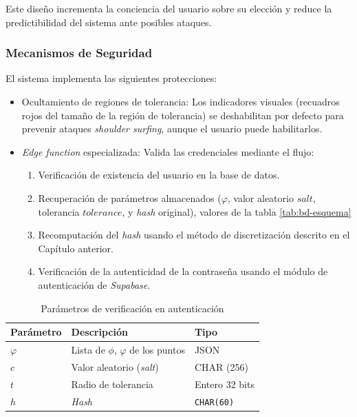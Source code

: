 Este diseño incrementa la conciencia del usuario sobre su elección y reduce la predictibilidad del sistema ante posibles ataques.

\subsubsection{Mecanismos de Seguridad}
El sistema implementa las siguientes protecciones:

\begin{itemize}
	\item Ocultamiento de regiones de tolerancia: Los indicadores visuales (recuadros rojos del tama\~no de la regi\'on de tolerancia) se deshabilitan por defecto para prevenir ataques \textit{shoulder surfing}, aunque el usuario puede habilitarlos.
	\item \textit{Edge function} especializada: Valida las credenciales mediante el flujo:
	\begin{enumerate}
		\item Verificación de existencia del usuario en la base de datos.
		\item Recuperación de parámetros almacenados ($\varphi$, valor aleatorio $salt$, tolerancia $tolerance$, y \textit{hash} original), valores de la tabla \ref{tab:bd-esquema}
		\item Recomputación del \textit{hash} usando el método de discretización descrito en el Capítulo anterior.
		\item Verificaci\'on de la autenticidad de la contrase\~na usando el m\'odulo de autenticaci\'on de \textit{Supabase}.
	\end{enumerate}
\end{itemize}

\begin{table}[ht]
	\centering
	\caption{Parámetros de verificación en autenticación}
	\label{tab:parametros-verificacion}
	\begin{tabularx}{\textwidth}{lXl}
		\toprule
		\textbf{Parámetro} & \textbf{Descripción} & \textbf{Tipo} \\
		\midrule
		$\varphi$ & Lista de $\phi$, $\varphi$ de los puntos & JSON \\
		$c$ & Valor aleatorio  (\textit{salt}) & CHAR (256) \\
		$t$ & Radio de tolerancia & Entero 32 bits \\
		$h$ & \textit{Hash} & \texttt{CHAR(60)} \\
		\bottomrule
	\end{tabularx}
\end{table}

